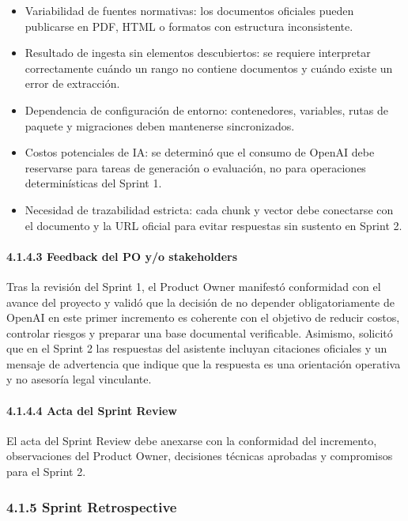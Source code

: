 \documentclass[12pt,a4paper,oneside]{report}
\begin{document}
\begin{itemize}
\item
  Variabilidad de fuentes normativas: los documentos oficiales pueden
  publicarse en PDF, HTML o formatos con estructura inconsistente.
\item
  Resultado de ingesta sin elementos descubiertos: se requiere
  interpretar correctamente cuándo un rango no contiene documentos y
  cuándo existe un error de extracción.
\item
  Dependencia de configuración de entorno: contenedores, variables,
  rutas de paquete y migraciones deben mantenerse sincronizados.
\item
  Costos potenciales de IA: se determinó que el consumo de OpenAI debe
  reservarse para tareas de generación o evaluación, no para operaciones
  determinísticas del Sprint 1.
\item
  Necesidad de trazabilidad estricta: cada chunk y vector debe
  conectarse con el documento y la URL oficial para evitar respuestas
  sin sustento en Sprint 2.
\end{itemize}

\paragraph{4.1.4.3 Feedback del PO y/o
stakeholders}\label{feedback-del-po-yo-stakeholders}

Tras la revisión del Sprint 1, el Product Owner manifestó conformidad
con el avance del proyecto y validó que la decisión de no depender
obligatoriamente de OpenAI en este primer incremento es coherente con el
objetivo de reducir costos, controlar riesgos y preparar una base
documental verificable. Asimismo, solicitó que en el Sprint 2 las
respuestas del asistente incluyan citaciones oficiales y un mensaje de
advertencia que indique que la respuesta es una orientación operativa y
no asesoría legal vinculante.

\paragraph{4.1.4.4 Acta del Sprint Review}\label{acta-del-sprint-review}

El acta del Sprint Review debe anexarse con la conformidad del
incremento, observaciones del Product Owner, decisiones técnicas
aprobadas y compromisos para el Sprint 2.

\subsubsection{4.1.5 Sprint Retrospective}\label{sprint-retrospective}
\end{document}
